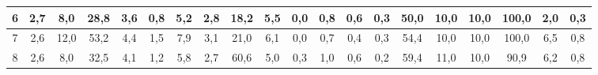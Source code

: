 \begin{sidewaystable}[]
\begin{tabular}{|c|c|c|c|c|c|c|c|c|c|c|c|c|c|c|c|c|c|c|c|}
    6  & 2,7                                              & 8,0                                              & 28,8                                             & 3,6                                              & 0,8                                              & 5,2                                              & 2,8                                              & 18,2                                             & 5,5                                              & 0,0                                              & 0,8                                              & 0,6                                              & 0,3                                              & 50,0                                            & 10,0                                            & 10,0                                            & 100,0                                           & 2,0                                             & 0,3                                             \\ \hline
    7  & 2,6                                              & 12,0                                             & 53,2                                             & 4,4                                              & 1,5                                              & 7,9                                              & 3,1                                              & 21,0                                             & 6,1                                              & 0,0                                              & 0,7                                              & 0,4                                              & 0,3                                              & 54,4                                            & 10,0                                            & 10,0                                            & 100,0                                           & 6,5                                             & 0,8                                             \\ \hline
    8  & 2,6                                              & 8,0                                              & 32,5                                             & 4,1                                              & 1,2                                              & 5,8                                              & 2,7                                              & 60,6                                             & 5,0                                              & 0,3                                              & 1,0                                              & 0,6                                              & 0,2                                              & 59,4                                            & 11,0                                            & 10,0                                            & 90,9                                            & 6,2                                             & 0,8                                             \\ \hline

\end{tabular}
\end{sidewaystable}
